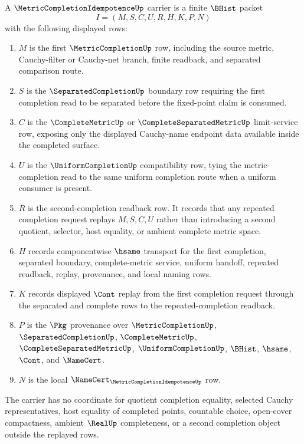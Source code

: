 \begin{definition}
\label{def:metric-completion-idempotence-carrier}
A $\MetricCompletionIdempotenceUp$ carrier is a finite $\BHist$ packet
$$
I=(M,S,C,U,R,H,K,P,N)
$$
with the following displayed rows:
\begin{enumerate}
\item $M$ is the first $\MetricCompletionUp$ row, including the source metric, Cauchy-filter or Cauchy-net branch, finite readback, and separated comparison route.
\item $S$ is the $\SeparatedCompletionUp$ boundary row requiring the first completion read to be separated before the fixed-point claim is consumed.
\item $C$ is the $\CompleteMetricUp$ or $\CompleteSeparatedMetricUp$ limit-service row, exposing only the displayed Cauchy-name endpoint data available inside the completed surface.
\item $U$ is the $\UniformCompletionUp$ compatibility row, tying the metric-completion read to the same uniform completion route when a uniform consumer is present.
\item $R$ is the second-completion readback row. It records that any repeated completion request replays $M,S,C,U$ rather than introducing a second quotient, selector, host equality, or ambient complete metric space.
\item $H$ records componentwise $\hsame$ transport for the first completion, separated boundary, complete-metric service, uniform handoff, repeated readback, replay, provenance, and local naming rows.
\item $K$ records displayed $\Cont$ replay from the first completion request through the separated and complete rows to the repeated-completion readback.
\item $P$ is the $\Pkg$ provenance over $\MetricCompletionUp$, $\SeparatedCompletionUp$, $\CompleteMetricUp$, $\CompleteSeparatedMetricUp$, $\UniformCompletionUp$, $\BHist$, $\hsame$, $\Cont$, and $\NameCert$.
\item $N$ is the local $\NameCert_{\MetricCompletionIdempotenceUp}$ row.
\end{enumerate}
The carrier has no coordinate for quotient completion equality, selected Cauchy representatives, host equality of completed points, countable choice, open-cover compactness, ambient $\RealUp$ completeness, or a second completion object outside the replayed rows.
\end{definition}

